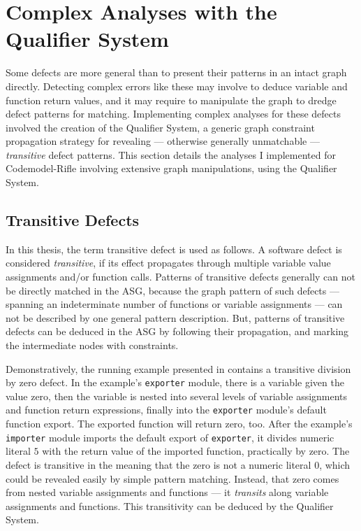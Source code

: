 \section{Complex Analyses with the Qualifier System}

Some defects are more general than to present their patterns in an intact graph directly. Detecting complex errors like these may involve to deduce variable and function return values, and it may require to manipulate the graph to dredge defect patterns for matching. Implementing complex analyses for these defects involved the creation of the Qualifier System, a generic graph constraint propagation strategy for revealing — otherwise generally unmatchable — \emph{transitive} defect patterns. This section details the analyses I implemented for Codemodel-Rifle involving extensive graph manipulations, using the Qualifier System.


\subsection{Transitive Defects}

In this thesis, the term transitive defect is used as follows. A software defect is considered \emph{transitive}, if its effect propagates through multiple variable value assignments and/or function calls. Patterns of transitive defects generally can not be directly matched in the ASG, because the graph pattern of such defects — spanning an indeterminate number of functions or variable assignments — can not be described by one general pattern description. But, patterns of transitive defects can be deduced in the ASG by following their propagation, and marking the intermediate nodes with constraints.

Demonstratively, the running example presented in  contains a transitive division by zero defect. In the example's \lstinline{exporter} module, there is a variable given the value zero, then the variable is nested into several levels of variable assignments and function return expressions, finally into the \lstinline{exporter} module's default function export. The exported function will return zero, too. After the example's \lstinline{importer} module imports the default export of \lstinline{exporter}, it divides numeric literal $5$ with the return value of the imported function, practically by zero. The defect is transitive in the meaning that the zero is not a numeric literal $0$, which could be revealed easily by simple pattern matching. Instead, that zero comes from nested variable assignments and functions — it \emph{transits} along variable assignments and functions. This transitivity can be deduced by the Qualifier System.

